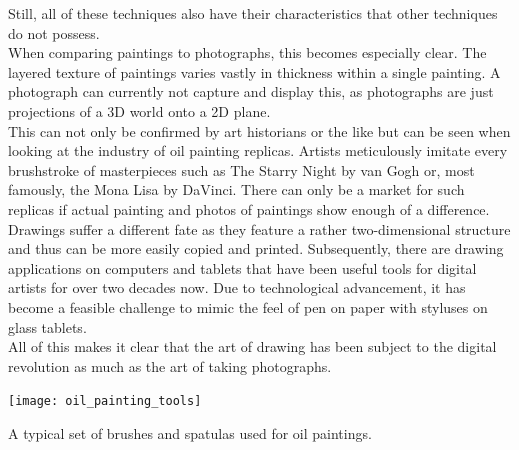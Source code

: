 Still, all of these techniques also have their characteristics that other techniques do not possess. \\
When comparing paintings to photographs, this becomes especially clear.
The layered texture of paintings varies vastly in thickness within a single painting.
A photograph can currently not capture and display this, as photographs are just projections of a 3D world onto a 2D plane.\\
This can not only be confirmed by art historians or the like but can be seen when looking at the industry of oil painting replicas.
Artists meticulously imitate every brushstroke of masterpieces such as The Starry Night by van Gogh or, most famously, the Mona Lisa by DaVinci.
There can only be a market for such replicas if actual painting and photos of paintings show enough of a difference.\\
Drawings suffer a different fate as they feature a rather two-dimensional structure and thus can be more easily copied and printed.
Subsequently, there are drawing applications on computers and tablets that have been useful tools for digital artists for over two decades now.
Due to technological advancement, it has become a feasible challenge to mimic the feel of pen on paper with styluses on glass tablets.\\
All of this makes it clear that the art of drawing has been subject to the digital revolution as much as the art of taking photographs.
\begin{marginfigure}
    \texttt{[image: oil\_painting\_tools]}
    \caption[]{A typical set of brushes and spatulas used for oil paintings.} %
\end{marginfigure}

